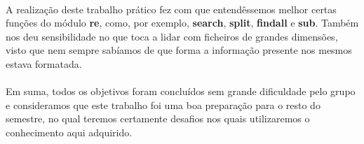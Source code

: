 \documentclass[11pt,a4paper]{report}
\begin{document}
\paragraph{}
A realização deste trabalho prático fez com que entendêssemos melhor certas funções do módulo \textbf{re}, como, por exemplo, \textbf{search}, \textbf{split}, \textbf{findall} e \textbf{sub}. Também nos deu sensibilidade no que toca a lidar com ficheiros de grandes dimensões, visto que nem sempre sabíamos de que forma a informação presente nos mesmos estava formatada.  
\paragraph{}
Em suma, todos os objetivos foram concluídos sem grande dificuldade pelo grupo e consideramos que este trabalho foi uma boa preparação para o resto do semestre, no qual teremos certamente desafios nos quais utilizaremos o conhecimento aqui adquirido. 
\end{document}
